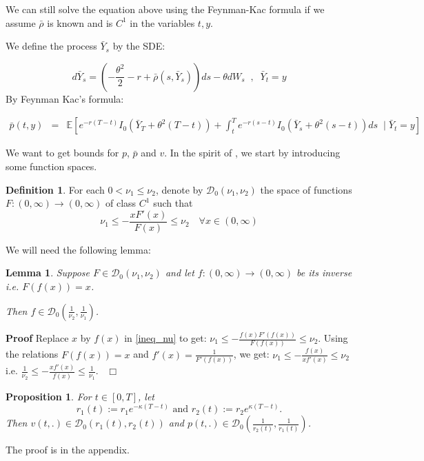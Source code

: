 \documentclass[11pt, psfig]{article}
\newtheorem{lemma}[theorem]{Lemma}
\newtheorem{proposition}[theorem]{Proposition}
\theoremstyle{definition}
\newtheorem{definition}[theorem]{Definition}
\theoremstyle{remark}
\numberwithin{equation}{section}
\def\sE{\mathbb{E}}
\newcommand{\be}{\begin{equation}}
\newcommand{\ee}{\end{equation}}
\def \proof{{\noindent \bf Proof}\quad}
\def \ep{\hbox{ }\hfill$\Box$}
\begin{document}
We can still solve the equation above using the Feynman-Kac formula if we assume $\bar{\rho}$ is known 
and is $C^{1}$ in the variables $t, y$.                                                                                                                                                             

We define the process $\bar{Y}_s$ by the SDE:

\begin{equation}\label{SDE_barY}
d\bar{Y}_{s}=(-\frac{\theta^2}{2}-r+\bar{\rho}(s,\bar{Y}_{s}))ds-\theta dW_{s} \;\; , \;\;  \bar{Y}_t=y 
\end{equation}
By Feynman Kac's formula:

\begin{eqnarray*}
\bar{p}(t,y) &=& \sE\left[  e^{-r(T-t) } I_{0}(\bar{Y}_T+\theta^2(T-t))+\int_{t}^T e^{- r(s-t) } I_{0}(\bar{Y}_s+\theta^2(s-t))ds  \;\; \bigg|\; \bar{Y}_t=y \right]
\end{eqnarray*}

We want to get bounds for $p$, $\bar{p}$ and $v$. 
In the spirit of \cite{Na_Za1}, we start by introducing some function spaces.
\begin{definition}
For each $0<\nu_1\leq \nu_2$, denote by $\mathcal{D}_0(\nu_1, \nu_2)$ the space of functions $F:(0,\infty)\rightarrow (0,\infty)$ of class $C^1$ such that
\be \label{ineq_nu}
\nu_1 \leq -\frac{xF'(x)}{F(x)}\leq \nu_{2}\quad \forall x\in (0,\infty)
\ee
\end{definition}
We will need the following lemma:
\begin{lemma}\label{lemma_D0}
Suppose $F\in \mathcal{D}_0(\nu_1, \nu_2)$ and let $f:(0,\infty)\rightarrow (0,\infty)$ be its inverse i.e. $F(f(x))=x$.
 
 Then $f\in \mathcal{D}_0\left(\frac{1}{\nu_2}, \frac{1}{\nu_1}\right)$.
\end{lemma}
\proof
Replace $x$ by $f(x)$ in \eqref{ineq_nu} to get:
$\nu_1 \leq -\frac{f(x)F'(f(x))}{F(f(x))}\leq \nu_{2}$. Using the relations $F(f(x))=x$ and $f'(x)=\frac{1}{F'(f(x))}$, we get:
$\nu_1 \leq -\frac{f(x)}{xf'(x)}\leq \nu_{2}$ i.e.  $\frac{1}{\nu_2} \leq -\frac{x f'(x)}{f(x)}\leq \frac{1}{\nu_1}$.
\ep



\begin{proposition}\label{p_v_D0}
For $t\in [0,T]$, let \be
r_1(t) := r_1 e^{-\kappa (T-t)} \text{ and } r_2(t) := r_2 e^{\kappa (T-t)}.
\ee
Then $v(t, .) \in \mathcal{D}_0(r_1 (t), r_2(t))$ and
$p(t, .) \in \mathcal{D}_0\left( \frac{1}{r_2(t)},     \frac{1}{r_1(t)}\right)$.

\end{proposition}
The proof is in the appendix.
\end{document}

